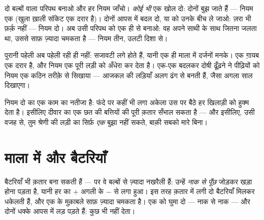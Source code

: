 \begin{example}[नियमों को देखना]\label{ex:g4:series-circuits:seeing}
दो बल्बों वाला परिपथ बनाओ और हर नियम जाँचो। \emph{कोई भी} एक 
खोल दो: दोनों बुझ जाते हैं --- नियम एक (खुला ख़ाली सॉकेट एक दरार
है)। दोनों  आपस में बदल दो, या  को उनके बीच ले जाओ: ज़रा भी
फ़र्क़ नहीं --- नियम दो। अब उसी परिपथ को एक ही  से बनाओ: वह अपने
साथी के साथ जितना जलता था, उससे साफ़ ज़्यादा चमकता है --- नियम तीन,
उलटी दिशा से।
\end{example}

\begin{example}[सजावटी बत्तियों की गुत्थी सुलझी]\label{ex:g4:series-circuits:partylights}
पुरानी पहेली अब पहेली रही ही नहीं: सजावटी   लगे होते
हैं, यानी एक ही माला में दर्जनों मनके। एक ग़ायब  एक दरार है, और
नियम एक पूरी लड़ी को अँधेरा कर देता है। एक-एक  बदलकर दोषी 
ढूँढ़ने ने पीढ़ियों को नियम एक कठिन तरीक़े से सिखाया --- आजकल की
लड़ियाँ अलग ढंग से बनती हैं, जैसा अगला साल दिखाएगा।
\end{example}

\begin{remark}[स्विच सबको हुक्म देता है]\label{rem:g4:series-circuits:switch}
नियम दो का एक काम का नतीजा है: फंदे पर कहीं भी लगा अकेला  उस पर
बैठे हर खिलाड़ी को हुक्म देता है। इसीलिए दीवार का एक  छत की
बत्तियों की पूरी क़तार सँभाल सकता है --- और इसीलिए, उसी वजह से, तुम
श्रेणी की लड़ी का सिर्फ़ \emph{एक}  बुझा नहीं सकते, बाक़ी सबको
मारे बिना।
\end{remark}

\section{माला में और बैटरियाँ}

\begin{example}[नाक से पूँछ]\label{ex:g4:series-circuits:batteries}
बैटरियाँ भी  क़तार बना सकती हैं --- पर वे बल्बों से
ज़्यादा नखरैली हैं: उन्हें \emph{नाक से पूँछ} जोड़कर खड़ा होना पड़ता
है, यानी हर  का $+$ अगली के $-$ से लगा हुआ। इस तरह क़तार में लगी
दो बैटरियाँ मिलकर धकेलती हैं, और  एक  के मुक़ाबले साफ़
ज़्यादा चमकता है। एक  को घुमा दो --- नाक से नाक --- और दोनों
धक्के आपस में लड़ पड़ते हैं:  कुछ भी नहीं देता।
\end{example}


